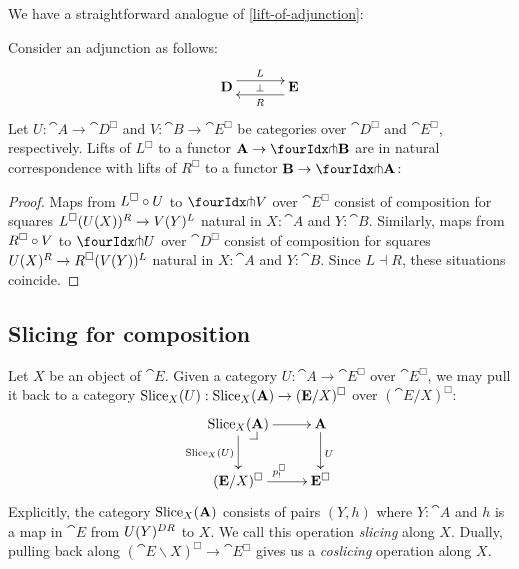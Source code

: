 \documentclass[reqno,10pt,a4paper,oneside]{amsart}
\begin{document}
We have a straightforward analogue of \cref{lift-of-adjunction}:

\begin{lemma}
\label{lift-of-adjunction}
Consider an adjunction as follows:
\[
\xymatrix@C+1em{
  \cat{D}
  \ar@<5pt>[r]^{L}
  \ar@{}[r]|{\bot}
&
  \cat{E}
  \ar@<5pt>[l]^{R}
}
\]
Let $U : \cat{A} \to \cat{D}^{\Box}$ and $V : \cat{B} \to \cat{E}^{\Box}$ be categories over $\cat{D}^{\Box}$ and $\cat{E}^{\Box}$, respectively.
Lifts of $L^{\Box}$ to a functor $\cat{A} \to \liftl{\cat{B}}$ are in natural correspondence with lifts of $R^{\Box}$ to a functor $\cat{B} \to \liftr{\cat{A}}$:
\end{lemma}

\begin{proof}
Maps from $L^{\Box} \mathbin{\circ} U$ to $\liftl{V}$ over $\cat{E}^{\Box}$ consist of composition for squares $L^{\Box}(U(X)){}^R \to V(Y){}^L$ natural in $X : \cat{A}$ and $Y : \cat{B}$.
Similarly, maps from $R^{\Box} \mathbin{\circ} V$ to $\liftr{U}$ over $\cat{D}^{\Box}$ consist of composition for squares $U(X){}^R \to R^{\Box}(V(Y)){}^L$ natural in $X : \cat{A}$ and $Y : \cat{B}$.
Since $L \dashv R$, these situations coincide.
\end{proof}

\subsection{Slicing for composition}

Let $X$ be an object of $\cat{E}$.
Given a category $U : \cat{A} \to \cat{E}^{\Box}$ over $\cat{E}^{\Box}$, we may pull it back to a category $\operatorname{Slice}_X(U) : \operatorname{Slice}_X(\mathbf{A}) \to (\mathbf{E}/X)^{\Box}$ over $(\cat{E}/X)^{\Box}$:
\[
\xymatrix{
  \Slice_X(\cat{A})
  \ar[r]
  \ar[d]_{\Slice_X(U)}
  \pullback{dr}
&
  \cat{A}
  \ar[d]^{U}
\\
  (\cat{E}/X)^{\Box}
  \ar[r]^{p_!^{\Box}}
&
  \cat{E}^{\Box}
}
\]
Explicitly, the category $\operatorname{Slice}_X(\mathbf{A})$ consists of pairs $(Y, h)$ where $Y : \cat{A}$ and $h$ is a map in $\cat{E}$ from $U(Y){}^{DR}$ to $X$.
We call this operation \emph{slicing} along $X$.
Dually, pulling back along $(\cat{E} \backslash X)^{\Box} \to \cat{E}^{\Box}$ gives us a \emph{coslicing} operation along $X$.
\end{document}
